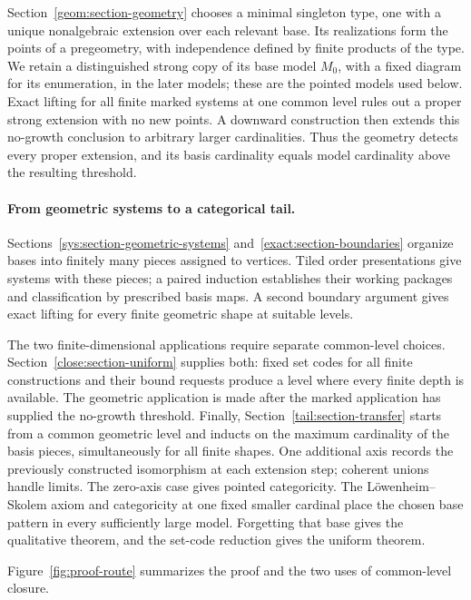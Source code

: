 Section~\ref{geom:section-geometry} chooses a minimal singleton type,
one with a unique nonalgebraic extension over each relevant base.  Its
realizations form the points of a pregeometry, with independence defined
by finite products of the type.  We retain a distinguished strong copy of
its base model $M_0$, with a fixed diagram for its enumeration, in the
later models; these are the pointed models used below.  Exact lifting for all finite marked
systems at one common level rules out a proper strong extension with no
new points.  A downward construction then extends this no-growth
conclusion to arbitrary larger cardinalities.  Thus the geometry detects
every proper extension, and its basis cardinality equals model
cardinality above the resulting threshold.

\paragraph{From geometric systems to a categorical tail.}
Sections~\ref{sys:section-geometric-systems} and~\ref{exact:section-boundaries}
organize bases into finitely many pieces assigned to vertices.  Tiled
order presentations give systems with these pieces; a paired induction
establishes their working packages and classification by prescribed
basis maps.  A second boundary argument gives exact lifting for every
finite geometric shape at suitable levels.

The two finite-dimensional applications require separate common-level
choices.  Section~\ref{close:section-uniform} supplies both: fixed set codes
for all finite constructions and their bound requests produce a level
where every finite depth is available.  The geometric application is made
after the marked application has supplied the no-growth threshold.
Finally, Section~\ref{tail:section-transfer} starts from a common geometric
level and inducts on the maximum cardinality of the basis pieces,
simultaneously for all finite shapes.  One additional axis records the
previously constructed isomorphism at each extension step; coherent
unions handle limits. The zero-axis case gives pointed categoricity.
The L\"owenheim--Skolem axiom and categoricity at one fixed smaller
cardinal place the chosen base pattern in every sufficiently large model.
Forgetting that base gives the qualitative theorem, and the set-code
reduction gives the uniform theorem.

Figure~\ref{fig:proof-route} summarizes the proof and the two uses of
common-level closure.



